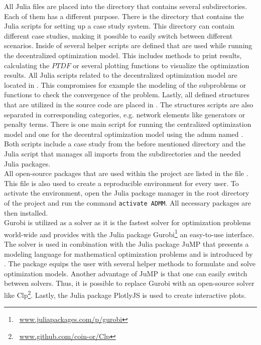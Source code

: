 All Julia files are placed into the directory  that contains several subdirectories. Each of them has a different purpose. There is the  directory that contains the Julia scripts for setting up a case study system. This directory can contain different case studies, making it possible to easily switch between different scenarios. Inside of  several helper scripts are defined that are used while running the decentralized optimization model. This includes methods to print results, calculating the $PTDF$ or several plotting functions to visualize the optimization results. All Julia scripts related to the decentralized optimization model are located in . This compromises for example the modeling of the subproblems or functions to check the convergence of the problem. Lastly, all defined structures that are utilized in the source code are placed in . The structures scripts are also separated in corresponding categories, e.g. network elements like generators or penalty terms. There is one main script for running the centralized optimization model  and one for the decentral optimization model using the \gls{admm} named . Both scripts include a case study from the before mentioned directory and the Julia script  that manages all imports from the subdirectories and the needed Julia packages.\\

All open-source packages that are used within the project are listed in the file . This file is also used to create a reproducible environment for every user. To activate the environment, open the Julia package manager in the root directory of the project and run the command \lstinline[language=sh]{activate ADMM}. All necessary packages are then installed.\\

Gurobi is utilized as a solver as it is the fastest solver for optimization problems world-wide and provides with the Julia package Gurobi\footnote{~\url{www.juliapackages.com/p/gurobi}} an easy-to-use interface. The solver is used in combination with the Julia package JuMP that presents a modeling language for mathematical optimization problems and is introduced by \citet{dunning2017}. The package equips the user with several helper methods to formulate and solve optimization models. Another advantage of JuMP is that one can easily switch between solvers. Thus, it is possible to replace Gurobi with an open-source solver like Clp\footnote{~\url{www.github.com/coin-or/Clp}}. Lastly, the  Julia package PlotlyJS is used to create interactive plots.

